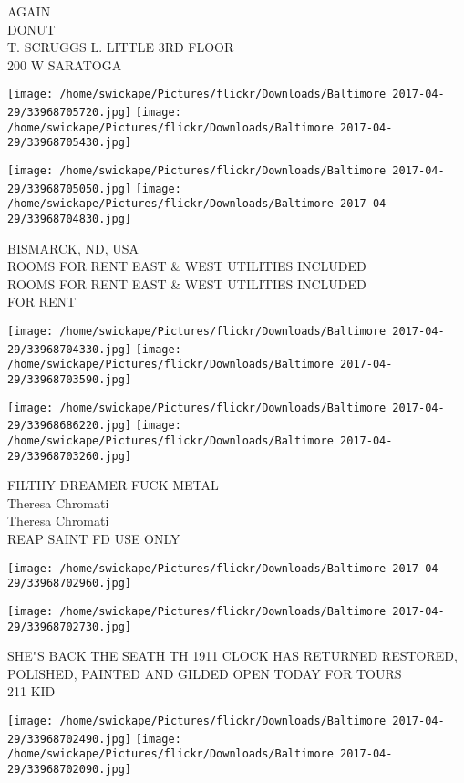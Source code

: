 \documentclass[10pt,letterpaper]{article}
\begin{document}
AGAIN\\
DONUT\\
T. SCRUGGS L. LITTLE 3RD FLOOR\\
200 W SARATOGA
\pagebreak

\texttt{[image: /home/swickape/Pictures/flickr/Downloads/Baltimore 2017-04-29/33968705720.jpg]}
\texttt{[image: /home/swickape/Pictures/flickr/Downloads/Baltimore 2017-04-29/33968705430.jpg]}

\texttt{[image: /home/swickape/Pictures/flickr/Downloads/Baltimore 2017-04-29/33968705050.jpg]}
\texttt{[image: /home/swickape/Pictures/flickr/Downloads/Baltimore 2017-04-29/33968704830.jpg]}

BISMARCK, ND, USA\\
ROOMS FOR RENT EAST \& WEST UTILITIES INCLUDED\\
ROOMS FOR RENT EAST \& WEST UTILITIES INCLUDED\\
FOR RENT
\pagebreak

\texttt{[image: /home/swickape/Pictures/flickr/Downloads/Baltimore 2017-04-29/33968704330.jpg]}
\texttt{[image: /home/swickape/Pictures/flickr/Downloads/Baltimore 2017-04-29/33968703590.jpg]}

\texttt{[image: /home/swickape/Pictures/flickr/Downloads/Baltimore 2017-04-29/33968686220.jpg]}
\texttt{[image: /home/swickape/Pictures/flickr/Downloads/Baltimore 2017-04-29/33968703260.jpg]}

FILTHY DREAMER FUCK METAL\\
Theresa Chromati\\
Theresa Chromati\\
REAP SAINT FD USE ONLY
\pagebreak

\texttt{[image: /home/swickape/Pictures/flickr/Downloads/Baltimore 2017-04-29/33968702960.jpg]}

\vspace{0.25in}
\texttt{[image: /home/swickape/Pictures/flickr/Downloads/Baltimore 2017-04-29/33968702730.jpg]}

SHE"S BACK THE SEATH TH 1911 CLOCK HAS RETURNED RESTORED, POLISHED, PAINTED AND GILDED OPEN TODAY FOR TOURS\\
211 KID
\pagebreak

\texttt{[image: /home/swickape/Pictures/flickr/Downloads/Baltimore 2017-04-29/33968702490.jpg]}
\texttt{[image: /home/swickape/Pictures/flickr/Downloads/Baltimore 2017-04-29/33968702090.jpg]}
\end{document}
